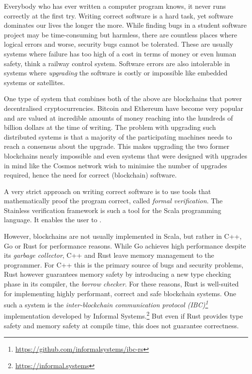 Everybody who has ever written a computer program knows, it never runs
correctly at the first try. Writing correct software is a hard task, yet
software dominates our lives the longer the more. While finding bugs in
a student software project may be time-consuming but harmless, there are
countless places where logical errors and worse, security bugs cannot be
tolerated. These are usually systems where failure has too high of a
cost in terms of money or even human safety, think a railway control
system. Software errors are also intolerable in systems where
\emph{upgrading} the software is costly or impossible like embedded
systems or satellites.

One type of system that combines both of the above are blockchains that power
decentralised cryptocurrencies. Bitcoin \cite{bitcoin} and Ethereum
\cite{ethereum} have become very popular and are valued at incredible amounts of
money reaching into the hundreds of billion dollars at the time of writing. The
problem with upgrading such distributed systems is that a majority of the
participating machines needs to reach a consensus about the upgrade. This makes
upgrading the two former blockchains nearly impossible and even systems that
were designed with upgrades in mind like the Cosmos network \cite{cosmos} wish
to minimise the number of upgrades required, hence the need for correct
(blockchain) software.

A very strict approach on writing correct software is to use tools that
mathematically proof the program correct, called \emph{formal verification}. The
Stainless verification framework \cite{stainless} is such a tool for the Scala
programming language. It enables the user to .

However, blockchains are not usually implemented in Scala, but rather in C++, Go
or Rust for performance reasons. While Go achieves high performance despite its
\emph{garbage collector}, C++ and Rust leave memory management to the
programmer. For C++ this is the primary source of bugs and security problems,
Rust however guarantees memory safety by introducing a new type checking phase
in its compiler, the \emph{borrow checker}. For these reasons, Rust is
well-suited for implementing highly performant, correct and safe blockchain
systems. One such a system is the \emph{inter-blockchain communication protocol
(IBC)\footnote{\url{https://github.com/informalsystems/ibc-rs}}} implementation
developed by Informal Systems.\footnote{\url{https://informal.systems}} But even
if Rust provides type safety and memory safety at compile time, this does not
guarantee correctness.

